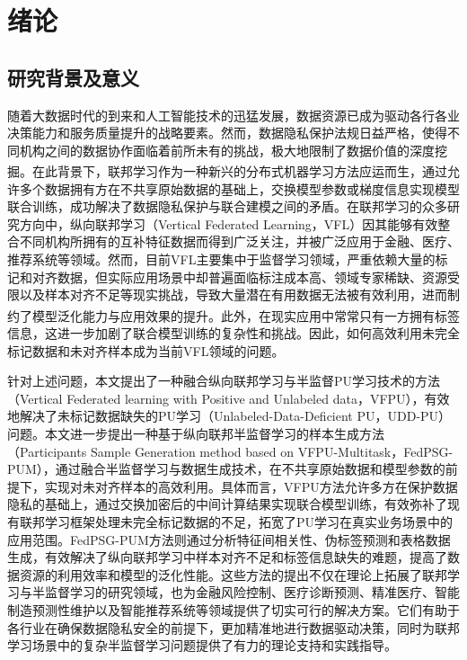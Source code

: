 \chapter{绪论} 
\thispagestyle{others} 
\pagestyle{others} 
\xiaosi 

\section{研究背景及意义}
随着大数据时代的到来和人工智能技术的迅猛发展，数据资源已成为驱动各行各业决策能力和服务质量提升的战略要素。然而，数据隐私保护法规日益严格，使得不同机构之间的数据协作面临着前所未有的挑战，极大地限制了数据价值的深度挖掘。在此背景下，联邦学习\textsuperscript{\cite{chen2021secureboost+,de2010practical}}作为一种新兴的分布式机器学习方法应运而生，通过允许多个数据拥有方在不共享原始数据的基础上，交换模型参数或梯度信息实现模型联合训练，成功解决了数据隐私保护与联合建模之间的矛盾。在联邦学习的众多研究方向中，纵向联邦学习（Vertical Federated Learning，VFL）因其能够有效整合不同机构所拥有的互补特征数据而得到广泛关注，并被广泛应用于金融、医疗、推荐系统等领域。然而，目前VFL主要集中于监督学习领域，严重依赖大量的标记和对齐数据，但实际应用场景中却普遍面临标注成本高、领域专家稀缺、资源受限以及样本对齐不足等现实挑战，导致大量潜在有用数据无法被有效利用，进而制约了模型泛化能力与应用效果的提升\textsuperscript{\cite{li2021comatch}}。此外，在现实应用中常常只有一方拥有标签信息，这进一步加剧了联合模型训练的复杂性和挑战。因此，如何高效利用未完全标记数据和未对齐样本成为当前VFL领域的问题。

针对上述问题，本文提出了一种融合纵向联邦学习与半监督PU学习技术的方法（Vertical Federated learning with Positive and Unlabeled data，VFPU），有效地解决了未标记数据缺失的PU学习（Unlabeled-Data-Deficient PU，UDD-PU）问题。本文进一步提出一种基于纵向联邦半监督学习的样本生成方法（Participants Sample Generation method based on VFPU-Multitask，FedPSG-PUM），通过融合半监督学习与数据生成技术，在不共享原始数据和模型参数的前提下，实现对未对齐样本的高效利用。具体而言，VFPU方法允许多方在保护数据隐私的基础上，通过交换加密后的中间计算结果实现联合模型训练，有效弥补了现有联邦学习框架处理未完全标记数据的不足，拓宽了PU学习在真实业务场景中的应用范围。FedPSG-PUM方法则通过分析特征间相关性、伪标签预测和表格数据生成，有效解决了纵向联邦学习中样本对齐不足和标签信息缺失的难题，提高了数据资源的利用效率和模型的泛化性能。这些方法的提出不仅在理论上拓展了联邦学习与半监督学习的研究领域，也为金融风险控制、医疗诊断预测、精准医疗、智能制造预测性维护以及智能推荐系统等领域提供了切实可行的解决方案。它们有助于各行业在确保数据隐私安全的前提下，更加精准地进行数据驱动决策，同时为联邦学习场景中的复杂半监督学习问题提供了有力的理论支持和实践指导。



